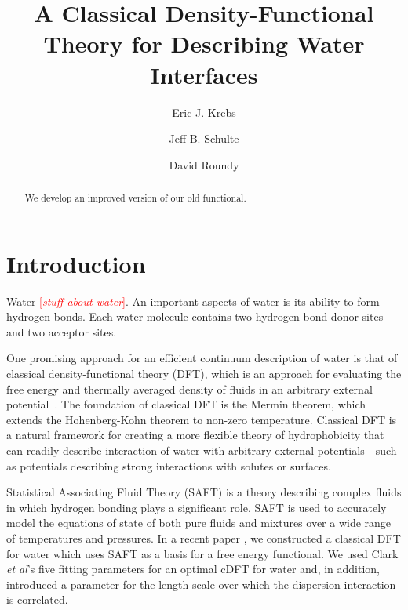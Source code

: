 \documentclass[twocolumn,amsmath,amssymb,prl]{revtex4-1}
\newcommand{\fixme}[1]{\textcolor{red}{[\emph{#1}]}}
\begin{document}
\title{A Classical Density-Functional Theory for Describing Water Interfaces}

\author{Eric J. Krebs}
\author{Jeff B. Schulte}
\author{David Roundy}

\begin{abstract}
We develop an improved version of our old functional.
\end{abstract}
\maketitle

\section{Introduction}

Water \fixme{stuff about water}.  An important aspects of water
is its ability to form hydrogen bonds.  Each water molecule contains
two hydrogen bond donor sites and two acceptor sites.

One promising approach for an efficient continuum description of water
is that of classical density-functional theory (DFT), which is an
approach for evaluating the free energy and thermally averaged density
of fluids in an arbitrary external potential~\cite{ebner1976density}.
The foundation of classical DFT is the Mermin
theorem\cite{mermin1965thermal}, which extends the Hohenberg-Kohn
theorem\cite{hohenberg1964inhomogeneous} to non-zero temperature.
Classical DFT is a natural framework for creating a more flexible
theory of hydrophobicity that can readily describe interaction of
water with arbitrary external potentials---such as potentials
describing strong interactions with solutes or surfaces.

Statistical Associating Fluid Theory (SAFT) is a theory describing
complex fluids in which hydrogen bonding plays a significant
role\cite{chapman1989saft, muller2001molecular}. SAFT is used to
accurately model the equations of state of both pure fluids and
mixtures over a wide range of temperatures and pressures. In a recent
paper \cite{hughes2013classical}, we constructed a classical DFT for
water which uses SAFT as a basis for a free energy functional. We
used Clark \emph{et al}'s \cite{clark2006developing} five fitting
parameters for an optimal cDFT for water and, in addition, introduced
a parameter for the length scale over which the dispersion interaction
is correlated.
\end{document}
